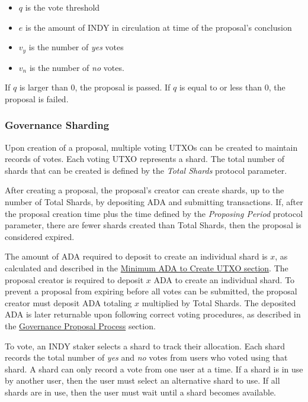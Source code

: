 \documentclass{article}
\begin{document}
\begin{sloppypar}
\begin{itemize}
\item
  \(q\) is the vote threshold
\item
  \(e\) is the amount of INDY in circulation at time of the proposal's
  conclusion
\item
  \(v_{y}\) is the number of \emph{yes} votes
\item
  \(v_{n}\) is the number of \emph{no} votes.
\end{itemize}

If \(q\) is larger than 0, the proposal is passed. If \(q\) is equal to
or less than 0, the proposal is failed.

\hypertarget{governance-sharding}{%
\subsubsection{Governance Sharding}\label{governance-sharding}}

Upon creation of a proposal, multiple voting UTXOs can be created to
maintain records of votes. Each voting UTXO represents a shard. The
total number of shards that can be created is defined by the \emph{Total
Shards} protocol parameter.

After creating a proposal, the proposal's creator can create shards, up
to the number of Total Shards, by depositing ADA and submitting
transactions. If, after the proposal creation time plus the time defined
by the \emph{Proposing Period} protocol parameter, there are fewer
shards created than Total Shards, then the proposal is considered
expired.

The amount of ADA required to deposit to create an individual shard is
\(x\), as calculated and described in the
\protect\hyperlink{minimum-ada-to-create-utxo}{Minimum ADA to Create
UTXO section}. The proposal creator is required to deposit \(x\) ADA to
create an individual shard. To prevent a proposal from expiring before
all votes can be submitted, the proposal creator must deposit ADA
totaling \(x\) multiplied by Total Shards. The deposited ADA is later
returnable upon following correct voting procedures, as described in the
\protect\hyperlink{governance-proposal-process}{Governance Proposal
Process} section.

To vote, an INDY staker selects a shard to track their allocation. Each
shard records the total number of \emph{yes} and \emph{no} votes from
users who voted using that shard. A shard can only record a vote from
one user at a time. If a shard is in use by another user, then the user
must select an alternative shard to use. If all shards are in use, then
the user must wait until a shard becomes available.


\end{sloppypar}
\end{document}
